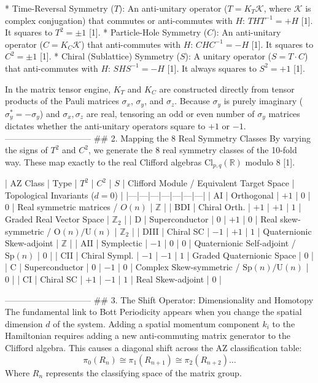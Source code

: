 * Time-Reversal Symmetry ($T$): An anti-unitary operator ($T = K_T \mathcal{K}$, where $\mathcal{K}$ is complex conjugation) that commutes or anti-commutes with $H$: $T H T^{-1} = +H$ [1]. It squares to $T^2 = \pm 1$ [1].
* Particle-Hole Symmetry ($C$): An anti-unitary operator ($C = K_C \mathcal{K}$) that anti-commutes with $H$: $C H C^{-1} = -H$ [1]. It squares to $C^2 = \pm 1$ [1].
* Chiral (Sublattice) Symmetry ($S$): A unitary operator ($S = T \cdot C$) that anti-commutes with $H$: $S H S^{-1} = -H$ [1]. It always squares to $S^2 = +1$ [1].

In the matrix tensor engine, $K_T$ and $K_C$ are constructed directly from tensor products of the Pauli matrices $\sigma_x$, $\sigma_y$, and $\sigma_z$. Because $\sigma_y$ is purely imaginary ($\sigma_y^* = -\sigma_y$) and $\sigma_x, \sigma_z$ are real, tensoring an odd or even number of $\sigma_y$ matrices dictates whether the anti-unitary operators square to $+1$ or $-1$.
------------------------------
## 2. Mapping the 8 Real Symmetry Classes
By varying the signs of $T^2$ and $C^2$, we generate the 8 real symmetry classes of the 10-fold way. These map exactly to the real Clifford algebras $\text{Cl}_{p,q}(\mathbb{R})$ modulo 8 [1].

| AZ Class | Type | $T^2$ | $C^2$ | $S$ | Clifford Module / Equivalent Target Space | Topological Invariants ($d=0$) |
|---|---|---|---|---|---|---|
| AI | Orthogonal | $+1$ | $0$ | $0$ | Real symmetric matrices / $O(n)$ | $\mathbb{Z}$ |
| BDI | Chiral Orth. | $+1$ | $+1$ | $1$ | Graded Real Vector Space | $\mathbb{Z}_2$ |
| D | Superconductor | $0$ | $+1$ | $0$ | Real skew-symmetric / $\text{O}(n)/\text{U}(n)$ | $\mathbb{Z}_2$ |
| DIII | Chiral SC | $-1$ | $+1$ | $1$ | Quaternionic Skew-adjoint | $\mathbb{Z}$ |
| AII | Symplectic | $-1$ | $0$ | $0$ | Quaternionic Self-adjoint / $\text{Sp}(n)$ | $0$ |
| CII | Chiral Sympl. | $-1$ | $-1$ | $1$ | Graded Quaternionic Space | $0$ |
| C | Superconductor | $0$ | $-1$ | $0$ | Complex Skew-symmetric / $\text{Sp}(n)/\text{U}(n)$ | $0$ |
| CI | Chiral SC | $+1$ | $-1$ | $1$ | Real Skew-adjoint | $0$ |

------------------------------
## 3. The Shift Operator: Dimensionality and Homotopy
The fundamental link to Bott Periodicity appears when you change the spatial dimension $d$ of the system. Adding a spatial momentum component $k_i$ to the Hamiltonian requires adding a new anti-commuting matrix generator to the Clifford algebra.
This causes a diagonal shift across the AZ classification table:
$$\pi_0(R_n) \cong \pi_1(R_{n+1}) \cong \pi_2(R_{n+2}) \dots$$ 
Where $R_n$ represents the classifying space of the matrix group.

